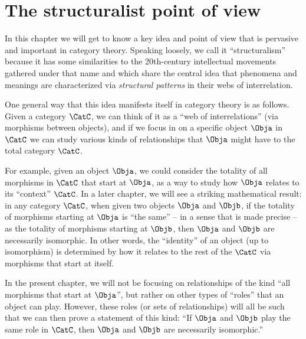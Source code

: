 
\section{The structuralist point of view}
\label{sec:structuralism}

In this chapter we will get to know a key idea and point of view that is pervasive and important in category theory. Speaking loosely, we call it ``structuralism'' because it has some similarities to the 20th-century intellectual movements gathered under that name and which share the central idea that phenomena and meanings are characterized via \emph{structural patterns} in their webs of interrelation. 

One general way that this idea manifests itself in category theory is as follows. Given a category $\CatC$, we can think of it as a ``web of interrelations'' (via morphisms between objects), and if we focus in on a specific object $\Obja$ in $\CatC$ we can study various kinds of relationships that $\Obja$ might have to the total category $\CatC$. 


For example, given an object $\Obja$, we could consider the totality of all morphisms in $\CatC$ that start at $\Obja$, as a way to study how $\Obja$ relates to its ``context'' $\CatC$. In a later chapter, we will see a striking mathematical result: in any category $\CatC$, when given two objects $\Obja$ and $\Objb$, if the totality of morphisms starting at $\Obja$ is ``the same'' -- in a sense that is made precise -- as the totality of morphisms starting at $\Objb$, then $\Obja$ and $\Objb$ are necessarily isomorphic. In other words, the ``identity'' of an object (up to isomorphism) is determined by how it relates to the rest of the $\CatC$ via morphisms that start at itself. 


In the present chapter, we will not be focusing on relationships of the kind ``all morphisms that start at $\Obja$'', but rather on other types of ``roles'' that an object can play. However, these roles (or sets of relationships) will all be such that we can then prove a statement of this kind: ``If $\Obja$ and $\Objb$ play the same role in $\CatC$, then $\Obja$ and $\Objb$ are necessarily isomorphic.'' 


